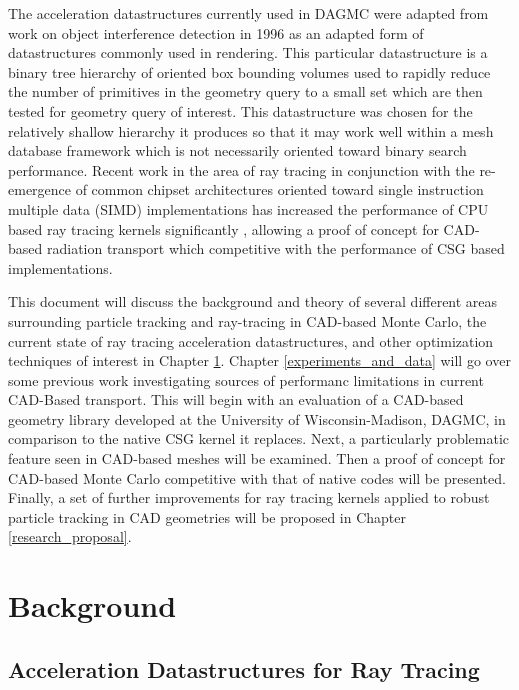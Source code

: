 \documentclass[12pt, a4paper]{article}
\begin{document}
The acceleration datastructures currently used in DAGMC were adapted from work on object interference detection in 1996 \cite{Gottschalk_1996} as an adapted form of datastructures commonly used in rendering. This particular datastructure is a binary tree hierarchy of oriented box bounding volumes used to rapidly reduce the number of primitives in the geometry query to a small set which are then tested for geometry query of interest. This datastructure was chosen for the relatively shallow hierarchy it produces so that it may work well within a mesh database framework which is not necessarily oriented toward binary search performance. Recent work in the area of ray tracing in conjunction with the re-emergence of common chipset architectures oriented toward single instruction multiple data (SIMD) implementations has increased the performance of CPU based ray tracing kernels significantly \cite{Wald_2008}, allowing a proof of concept for CAD-based radiation transport which competitive with the performance of CSG based implementations.

This document will discuss the background and theory of several different areas surrounding particle tracking and ray-tracing in CAD-based Monte Carlo, the current state of ray tracing acceleration datastructures, and other optimization techniques of interest in Chapter \ref{background}. Chapter \ref{experiments_and_data} will go over some previous work investigating sources of performanc limitations in current CAD-Based transport. This will begin with an evaluation of a CAD-based geometry library developed at the University of Wisconsin-Madison, DAGMC, in comparison to the native CSG kernel it replaces. Next, a particularly problematic feature seen in CAD-based meshes will be examined. Then a proof of concept for CAD-based Monte Carlo competitive with that of native codes will be presented. Finally, a set of further improvements for ray tracing kernels applied to robust particle tracking in CAD geometries will be proposed in Chapter \ref{research_proposal}. 


\section{Background}%
\label{background}


\subsection{Acceleration Datastructures for Ray Tracing}
\label{subsec:accel_datastructures}
\end{document}
